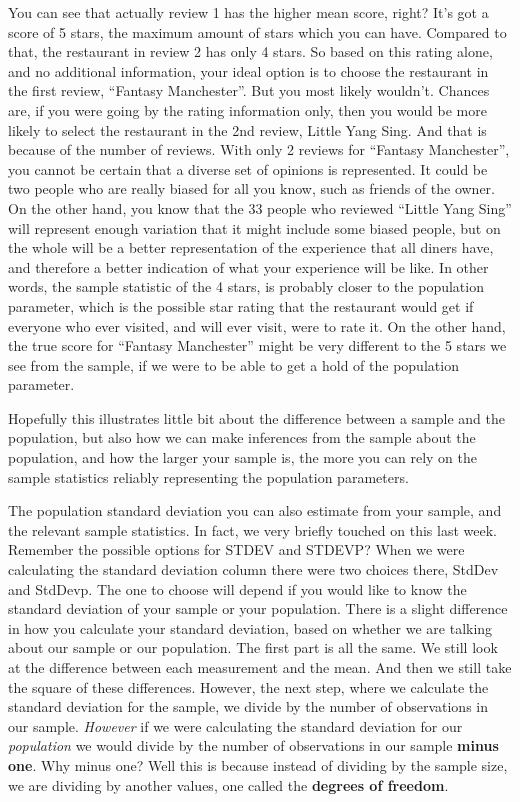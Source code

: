 \documentclass[]{book}
\theoremstyle{definition}
\theoremstyle{definition}
\theoremstyle{definition}
\theoremstyle{remark}
\begin{document}
You can see that actually review 1 has the higher mean score, right?
It's got a score of 5 stars, the maximum amount of stars which you can
have. Compared to that, the restaurant in review 2 has only 4 stars. So
based on this rating alone, and no additional information, your ideal
option is to choose the restaurant in the first review, ``Fantasy
Manchester''. But you most likely wouldn't. Chances are, if you were
going by the rating information only, then you would be more likely to
select the restaurant in the 2nd review, Little Yang Sing. And that is
because of the number of reviews. With only 2 reviews for ``Fantasy
Manchester'', you cannot be certain that a diverse set of opinions is
represented. It could be two people who are really biased for all you
know, such as friends of the owner. On the other hand, you know that the
33 people who reviewed ``Little Yang Sing'' will represent enough
variation that it might include some biased people, but on the whole
will be a better representation of the experience that all diners have,
and therefore a better indication of what your experience will be like.
In other words, the sample statistic of the 4 stars, is probably closer
to the population parameter, which is the possible star rating that the
restaurant would get if everyone who ever visited, and will ever visit,
were to rate it. On the other hand, the true score for ``Fantasy
Manchester'' might be very different to the 5 stars we see from the
sample, if we were to be able to get a hold of the population parameter.

Hopefully this illustrates little bit about the difference between a
sample and the population, but also how we can make inferences from the
sample about the population, and how the larger your sample is, the more
you can rely on the sample statistics reliably representing the
population parameters.

The population standard deviation you can also estimate from your
sample, and the relevant sample statistics. In fact, we very briefly
touched on this last week. Remember the possible options for STDEV and
STDEVP? When we were calculating the standard deviation column there
were two choices there, StdDev and StdDevp. The one to choose will
depend if you would like to know the standard deviation of your sample
or your population. There is a slight difference in how you calculate
your standard deviation, based on whether we are talking about our
sample or our population. The first part is all the same. We still look
at the difference between each measurement and the mean. And then we
still take the square of these differences. However, the next step,
where we calculate the standard deviation for the sample, we divide by
the number of observations in our sample. \emph{However} if we were
calculating the standard deviation for our \emph{population} we would
divide by the number of observations in our sample \textbf{minus one}.
Why minus one? Well this is because instead of dividing by the sample
size, we are dividing by another values, one called the \textbf{degrees
of freedom}.
\end{document}

